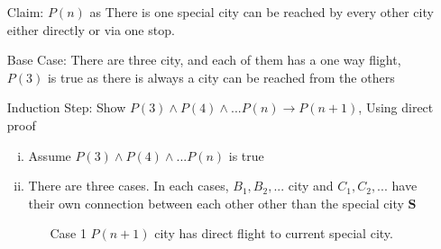 \documentclass{article}
\def\math#1{$#1$}
\begin{document}
\begin{itemize}
    \item [Claim: ] \math{P(n)} as There is one special city can be reached by every other city either directly or via one stop.
    \item [Base Case: ] There are three city, and each of them has a one way flight, \math{P(3)} is true as there is always a city can be reached from the others \\
    \item [Induction Step: ] Show \math{P(3) \land P(4) \land ... P(n) \to P(n+1)}, Using direct proof 
        \begin{enumerate}[i)]
            \item Assume \math{P(3) \land P(4) \land ... P(n)} is true
            \item There are three cases. In each cases, \math{B_1, B_2, ...} city and \math{C_1, C_2, ...} have their own connection between each other other than the special city \math{\mathbf{S}}
                \begin{itemize}
                    \item [Case 1] \math{P(n+1)} city has direct flight to current special city. \\ 
\end{itemize}
\end{enumerate}
\end{itemize}
\end{document}
